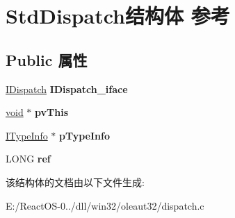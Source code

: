 \hypertarget{struct_std_dispatch}{}\section{Std\+Dispatch结构体 参考}
\label{struct_std_dispatch}
\subsection*{Public 属性}
\begin{DoxyCompactItemize}
\item 
\mbox{\label{struct_std_dispatch_a47775c6a60a9efa4e57f9ff50cc6697a}} 
\hyperlink{interface_i_dispatch}{I\+Dispatch} {\bfseries I\+Dispatch\+\_\+iface}
\item 
\mbox{\label{struct_std_dispatch_aee278871593c04cdef0baf7b570d239b}} 
\hyperlink{interfacevoid}{void} $\ast$ {\bfseries pv\+This}
\item 
\mbox{\label{struct_std_dispatch_af6b80c8d29a5e26e46241bf84660adfb}} 
\hyperlink{interface_i_type_info}{I\+Type\+Info} $\ast$ {\bfseries p\+Type\+Info}
\item 
\mbox{\label{struct_std_dispatch_a37f313fa6616d6789efa5de7c34eed27}} 
L\+O\+NG {\bfseries ref}
\end{DoxyCompactItemize}


该结构体的文档由以下文件生成\+:\begin{DoxyCompactItemize}
\item 
E\+:/\+React\+O\+S-\/0../dll/win32/oleaut32/dispatch.\+c\end{DoxyCompactItemize}
